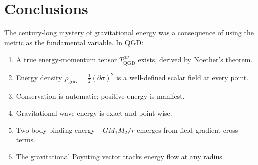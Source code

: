 \documentclass[11pt,a4paper]{article}
\theoremstyle{plain}
\theoremstyle{definition}
\theoremstyle{remark}
\begin{document}
\section{Conclusions}
\label{sec:conclusions}

The century-long mystery of gravitational energy was a consequence of using the metric as the fundamental variable.  In QGD:

\begin{enumerate}
  \item A true energy-momentum tensor $T^{\mu\nu}_{\mathrm{QGD}}$ exists, derived by Noether's theorem.
  \item Energy density $\rho_{\mathrm{grav}} = \tfrac{1}{2}(\partial\sigma)^2$ is a well-defined scalar field at every point.
  \item Conservation is automatic; positive energy is manifest.
  \item Gravitational wave energy is exact and point-wise.
  \item Two-body binding energy $-GM_1M_2/r$ emerges from field-gradient cross terms.
  \item The gravitational Poynting vector tracks energy flow at any radius.
\end{enumerate}
\end{document}
